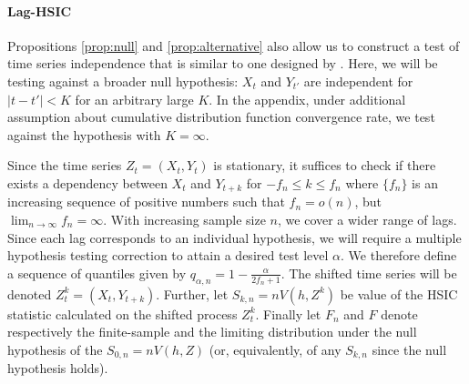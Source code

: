 \documentclass{article} %
\begin{document}
\paragraph{Lag-HSIC}
Propositions \ref{prop:null} and \ref{prop:alternative} also allow us to construct a test of time series independence that is similar to one designed by  \cite{besserve_statistical_2013}. Here, we will be testing against a broader null hypothesis:  $X_t$ and $Y_{t'}$ are independent for $|t-t'|<K$ for an arbitrary large $K$. In the appendix, under additional assumption about cumulative distribution function convergence rate, we test against the hypothesis with $K=\infty$.

Since the time series $Z_t=(X_t,Y_t)$ is stationary, it suffices to check if there exists a dependency between $X_t$ and $Y_{t+k}$ for $-f_n \leq k \leq f_n$ where $\{f_n\}$ is an increasing sequence of positive numbers such that $f_n=o(n)$, but $\lim_{n\to\infty}f_n=\infty$. With increasing sample size $n$, we cover a wider range of lags. Since each lag corresponds to an individual hypothesis, we will require a multiple hypothesis testing correction to attain a desired test level $\alpha$. We therefore define a sequence of quantiles given by $q_{\alpha,n} = 1-\frac{\alpha}{2f_n+1}$. The shifted time series will be denoted $Z_t^k =(X_t,Y_{t+k})$. Further, let $S_{k,n}=n V(h,Z^k)$ be value of the HSIC statistic calculated on the shifted process $Z_t^k$. Finally let $F_n$ and $F$ denote respectively the finite-sample and the limiting distribution under the null hypothesis of the $S_{0,n} = n V(h,Z)$ (or, equivalently, of any $S_{k,n}$ since the null hypothesis holds).
\end{document}
